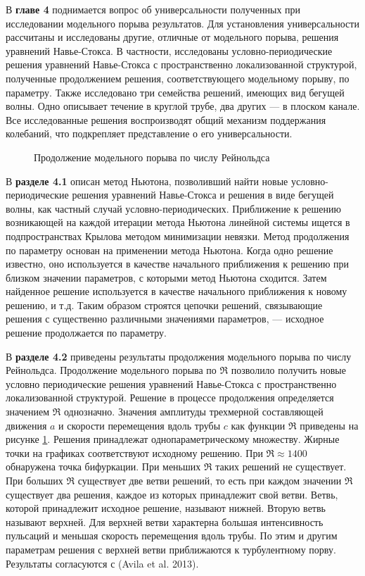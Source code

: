 В \textbf{главе 4} поднимается вопрос об универсальности полученных при исследовании модельного порыва результатов. Для установления универсальности рассчитаны и исследованы другие, отличные от модельного порыва, решения уравнений Навье-Стокса. В частности, исследованы условно-периодические решения уравнений Навье-Стокса с пространственно локализованной структурой, полученные продолжением решения, соответствующего модельному порыву, по параметру. Также исследовано три семейства решений, имеющих вид бегущей волны. Одно описывает течение в круглой трубе, два других --- в плоском канале. Все исследованные решения воспроизводят общий механизм поддержания колебаний, что подкрепляет представление о его универсальности.

\begin{figure}
\caption{Продолжение модельного порыва по числу Рейнольдса}
\label{contin_pic}
\end{figure} 

В \textbf{разделе 4.1} описан метод Ньютона, позволивший найти новые условно-периодические решения уравнений Навье-Стокса и решения в виде бегущей волны, как частный случай условно-периодических. Приближение к решению возникающей на каждой итерации метода Ньютона линейной системы ищется в подпространствах Крылова методом минимизации невязки. %
Метод продолжения по параметру основан на применении метода Ньютона. Когда одно решение известно, оно используется в качестве начального приближения к решению при близком значении параметров, с которыми метод Ньютона сходится. Затем найденное решение используется в качестве начального приближения к новому решению, и т.д. Таким образом строятся цепочки решений, связывающие решения с существенно различными значениями параметров, --- исходное решение продолжается по параметру.


В \textbf{разделе 4.2} приведены результаты продолжения модельного порыва по числу Рейнольдса. Продолжение модельного порыва по $\Re$ позволило получить новые условно периодические решения уравнений Навье-Стокса с пространственно локализованной структурой. Решение в процессе продолжения определяется значением $\Re$ однозначно. Значения амплитуды трехмерной составляющей движения $a$ и скорости перемещения вдоль трубы $c$ как функции $\Re$ приведены на рисунке \ref{contin_pic}. Решения принадлежат однопараметрическому множеству. Жирные точки на графиках соответствуют исходному решению. При $\Re \approx 1400$ обнаружена точка бифуркации. При меньших $\Re$ таких решений не существует. При больших $\Re$ существует две ветви решений, то есть при каждом значении $\Re$ существует два решения, каждое из которых принадлежит свой ветви. Ветвь, которой принадлежит исходное решение, называют нижней. Вторую ветвь называют верхней. Для верхней ветви характерна большая интенсивность пульсаций и меньшая скорость перемещения вдоль трубы. По этим и другим параметрам решения с верхней ветви приближаются к турбулентному порву. Результаты согласуются с (Avila et al. 2013). 

